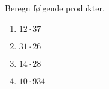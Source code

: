 \documentclass[../main.tex]{subfiles}
\begin{document}
\begin{prob}
    Beregn følgende produkter.
    \begin{enumerate}[label=\alph*)]
        \item \(\displaystyle 12 \cdot 37\)
        \vspace{3mm}
        \item \(\displaystyle 31 \cdot 26\)
        \vspace{3mm}
        \item \(\displaystyle 14 \cdot 28\)
        \vspace{3mm}
        \item \(\displaystyle 10 \cdot 934\)
    \end{enumerate}
\end{prob}
\end{document}
